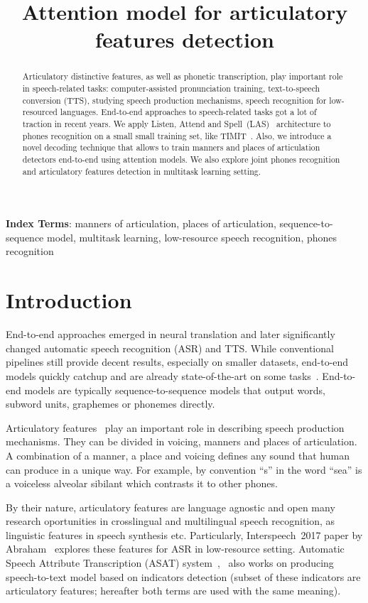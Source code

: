 \documentclass[a4paper]{article}
\title{Attention model for articulatory features detection}
\begin{document}
\maketitle
\begin{abstract}
Articulatory distinctive features, as well as phonetic transcription, play important role in speech-related tasks: computer-assisted pronunciation training, text-to-speech conversion (TTS), studying speech production mechanisms, speech recognition for low-resourced languages.
End-to-end approaches to speech-related tasks got a lot of traction in recent years. We apply Listen, Attend and Spell~(LAS)~\cite{Chan-LAS2016} architecture to phones recognition on a small small training set, like TIMIT~\cite{TIMIT-1992}. Also, we introduce a novel decoding technique that allows to train manners and places of articulation detectors end-to-end using attention models. We also explore joint phones recognition and articulatory features detection in multitask learning setting.
\end{abstract}
\noindent\textbf{Index Terms}: manners of articulation, places of articulation, sequence-to-sequence model, multitask learning, low-resource speech recognition, phones recognition

\section{Introduction}

End-to-end approaches emerged in neural translation and later significantly changed automatic speech recognition (ASR) and TTS. While conventional pipelines still provide decent results, especially on smaller datasets, end-to-end models quickly catchup and are already state-of-the-art on some tasks~\cite{Zeyer-IS2018}. End-to-end models are typically sequence-to-sequence models that output words, subword units, graphemes or phonemes directly.

Articulatory features~\cite{Chomsky-Halle-1968} play an important role in describing speech production mechanisms. They can be divided in voicing, manners and places of articulation. A combination of a manner, a place and voicing defines any sound that human can produce in a unique way. For example, by convention ``s'' in the word ``sea'' is a voiceless alveolar sibilant which contrasts it to other phones.

By their nature, articulatory features are language agnostic and open many research oportunities in crosslingual and multilingual speech recognition, as linguistic features in speech synthesis etc. Particularly, Interspeech~2017 paper by Abraham~\cite{Abraham-IS2017} explores these features for ASR in low-resource setting. Automatic Speech Attribute Transcription (ASAT) system~\cite{ASAT-2007},~\cite{ASAT-2014} also works on producing speech-to-text model based on indicators detection (subset of these indicators are articulatory features; hereafter both terms are used with the same meaning).
\end{document}

